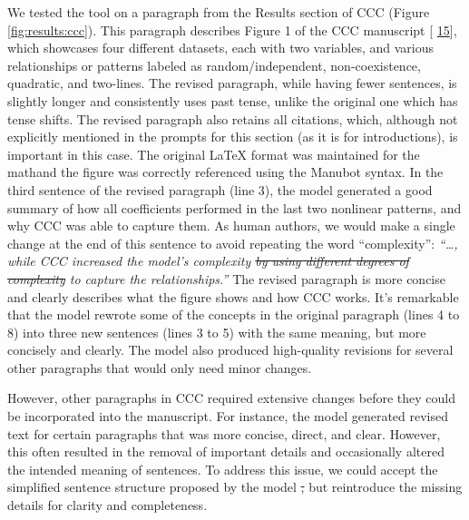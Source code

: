 \documentclass[
]{article}
\providecommand{\DIFaddtex}[1]{{\protect\color{blue}\uwave{#1}}} %
\providecommand{\DIFdeltex}[1]{{\protect\color{red}\sout{#1}}}                      %
\providecommand{\DIFaddbegin}{} %
\providecommand{\DIFaddend}{} %
\providecommand{\DIFdelbegin}{} %
\providecommand{\DIFdelend}{} %
\providecommand{\DIFadd}[1]{\texorpdfstring{\DIFaddtex{#1}}{#1}} %
\providecommand{\DIFdel}[1]{\texorpdfstring{\DIFdeltex{#1}}{}} %
\newcommand{\DIFscaledelfig}{0.5}
\newlength{\DIFdelgraphicswidth} %
\newlength{\DIFdelgraphicsheight} %
\newcommand{\DIFaddincludegraphics}[2][]{{\color{blue}\fbox{\DIFOincludegraphics[#1]{#2}}}} %
\newcommand{\DIFdelincludegraphics}[2][]{%
\sbox{\DIFdelgraphicsbox}{\DIFOincludegraphics[#1]{#2}}%
\settoboxwidth{\DIFdelgraphicswidth}{\DIFdelgraphicsbox} %
\settoboxtotalheight{\DIFdelgraphicsheight}{\DIFdelgraphicsbox} %
\scalebox{\DIFscaledelfig}{%
\parbox[b]{\DIFdelgraphicswidth}{\usebox{\DIFdelgraphicsbox}\\[-\baselineskip] \rule{\DIFdelgraphicswidth}{0em}}\llap{\resizebox{\DIFdelgraphicswidth}{\DIFdelgraphicsheight}{%
\setlength{\unitlength}{\DIFdelgraphicswidth}%
\begin{picture}(1,1)%
\thicklines\linethickness{2pt} %
{\color[rgb]{1,0,0}\put(0,0){\framebox(1,1){}}}%
{\color[rgb]{1,0,0}\put(0,0){\line( 1,1){1}}}%
{\color[rgb]{1,0,0}\put(0,1){\line(1,-1){1}}}%
\end{picture}%
}\hspace*{3pt}}} %
} %
\DeclareRobustCommand{\DIFaddbegin}{\DIFOaddbegin \let\includegraphics\DIFaddincludegraphics} %
\DeclareRobustCommand{\DIFaddend}{\DIFOaddend \let\includegraphics\DIFOincludegraphics} %
\DeclareRobustCommand{\DIFdelbegin}{\DIFOdelbegin \let\includegraphics\DIFdelincludegraphics} %
\DeclareRobustCommand{\DIFdelend}{\DIFOaddend \let\includegraphics\DIFOincludegraphics} %
\begin{document}
We tested the tool on a paragraph from the Results section of CCC (Figure \ref{fig:results:ccc}).
This paragraph describes Figure 1 of the CCC manuscript {[}\protect\DIFdelbegin %
\DIFdelend \DIFaddbegin \hyperlink{ref-eirYTTyk}{15}{]}\DIFaddend , which showcases four different datasets, each with two variables, and various relationships or patterns labeled as random/independent, non-coexistence, quadratic, and two-lines.
The revised paragraph, while having fewer sentences, is slightly longer and consistently uses \DIFaddbegin \DIFadd{the }\DIFaddend past tense, unlike the original one which has tense shifts.
The revised paragraph also retains all citations, which, although not explicitly mentioned in the prompts for this section (as it is for introductions), is important in this case.
The original LaTeX format was maintained for the math\DIFaddbegin \DIFadd{, }\DIFaddend and the figure was correctly referenced using the Manubot syntax.
In the third sentence of the revised paragraph (line 3), the model generated a good summary of how all coefficients performed in the last two nonlinear patterns, and why CCC was able to capture them.
As human authors, we would make a single change at the end of this sentence to avoid repeating the word ``complexity'': \emph{``\ldots, while CCC increased the model's complexity \sout{by using different degrees of complexity} to capture the relationships.''}
The revised paragraph is more concise and clearly describes what the figure shows and how CCC works.
It's remarkable that the model rewrote some of the concepts in the original paragraph (lines 4 to 8) into three new sentences (lines 3 to 5) with the same meaning, but more concisely and clearly.
The model also produced high-quality revisions for several other paragraphs that would only need minor changes.

However, other paragraphs in CCC required extensive changes before they could be incorporated into the manuscript.
For instance, the model generated revised text for certain paragraphs that was more concise, direct, and clear.
However, this often resulted in the removal of important details and occasionally altered the intended meaning of sentences.
To address this issue, we could accept the simplified sentence structure proposed by the model \DIFdelbegin \DIFdel{, }\DIFdelend but reintroduce the missing details for clarity and completeness.

% 
\end{document}
